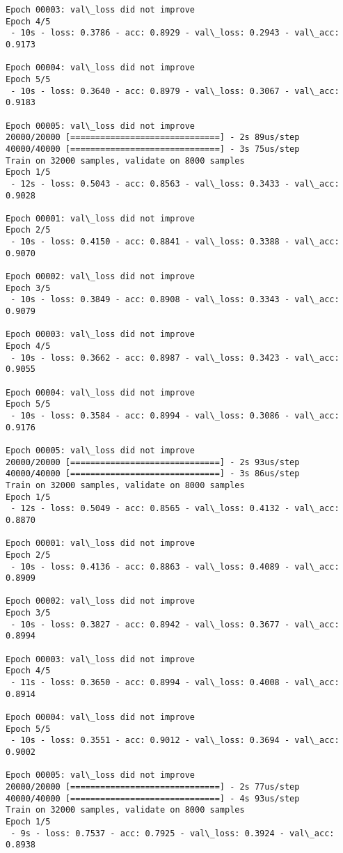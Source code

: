 \documentclass[11pt]{article}
\begin{document}
\begin{Verbatim}[commandchars=\\\{\}]
Epoch 00003: val\_loss did not improve
Epoch 4/5
 - 10s - loss: 0.3786 - acc: 0.8929 - val\_loss: 0.2943 - val\_acc: 0.9173

Epoch 00004: val\_loss did not improve
Epoch 5/5
 - 10s - loss: 0.3640 - acc: 0.8979 - val\_loss: 0.3067 - val\_acc: 0.9183

Epoch 00005: val\_loss did not improve
20000/20000 [==============================] - 2s 89us/step
40000/40000 [==============================] - 3s 75us/step
Train on 32000 samples, validate on 8000 samples
Epoch 1/5
 - 12s - loss: 0.5043 - acc: 0.8563 - val\_loss: 0.3433 - val\_acc: 0.9028

Epoch 00001: val\_loss did not improve
Epoch 2/5
 - 10s - loss: 0.4150 - acc: 0.8841 - val\_loss: 0.3388 - val\_acc: 0.9070

Epoch 00002: val\_loss did not improve
Epoch 3/5
 - 10s - loss: 0.3849 - acc: 0.8908 - val\_loss: 0.3343 - val\_acc: 0.9079

Epoch 00003: val\_loss did not improve
Epoch 4/5
 - 10s - loss: 0.3662 - acc: 0.8987 - val\_loss: 0.3423 - val\_acc: 0.9055

Epoch 00004: val\_loss did not improve
Epoch 5/5
 - 10s - loss: 0.3584 - acc: 0.8994 - val\_loss: 0.3086 - val\_acc: 0.9176

Epoch 00005: val\_loss did not improve
20000/20000 [==============================] - 2s 93us/step
40000/40000 [==============================] - 3s 86us/step
Train on 32000 samples, validate on 8000 samples
Epoch 1/5
 - 12s - loss: 0.5049 - acc: 0.8565 - val\_loss: 0.4132 - val\_acc: 0.8870

Epoch 00001: val\_loss did not improve
Epoch 2/5
 - 10s - loss: 0.4136 - acc: 0.8863 - val\_loss: 0.4089 - val\_acc: 0.8909

Epoch 00002: val\_loss did not improve
Epoch 3/5
 - 10s - loss: 0.3827 - acc: 0.8942 - val\_loss: 0.3677 - val\_acc: 0.8994

Epoch 00003: val\_loss did not improve
Epoch 4/5
 - 11s - loss: 0.3650 - acc: 0.8994 - val\_loss: 0.4008 - val\_acc: 0.8914

Epoch 00004: val\_loss did not improve
Epoch 5/5
 - 10s - loss: 0.3551 - acc: 0.9012 - val\_loss: 0.3694 - val\_acc: 0.9002

Epoch 00005: val\_loss did not improve
20000/20000 [==============================] - 2s 77us/step
40000/40000 [==============================] - 4s 93us/step
Train on 32000 samples, validate on 8000 samples
Epoch 1/5
 - 9s - loss: 0.7537 - acc: 0.7925 - val\_loss: 0.3924 - val\_acc: 0.8938


\end{Verbatim}
\end{document}
